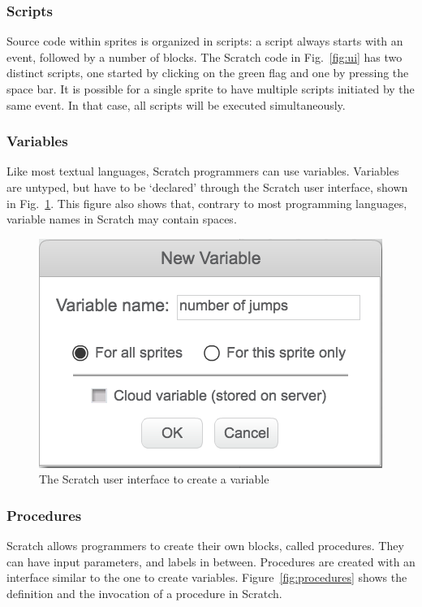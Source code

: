 \documentclass[conference]{IEEEtran}
\begin{document}
\subsubsection{Scripts}
Source code within sprites is organized in scripts: a script always starts with an event, followed by a number of blocks. The Scratch code in Fig.~\ref{fig:ui} has two distinct scripts, one started by clicking on the green flag and one by pressing the space bar. It is possible for a single sprite to have multiple scripts initiated by the same event. In that case, all scripts will be executed simultaneously. 



\subsubsection{Variables}
Like most textual languages, Scratch programmers can use variables. Variables are untyped, but have to be `declared' through the Scratch user interface, shown in Fig.~\ref{fig:ui-vars}. This figure also shows that, contrary to most programming languages, variable names in Scratch may contain spaces.

\begin{figure}[tb]
  \begin{center}
  \includegraphics[scale=0.45]{fig/ui-vars.png}
  \caption{The Scratch user interface to create a variable}
  \label{fig:ui-vars}
  \end{center}
\end{figure} 

\subsubsection{Procedures} \label {sec:Scratch_func}
Scratch allows programmers to create their own blocks, called procedures. They can have input parameters, and labels in between. Procedures are created with an interface similar to the one to create variables. Figure~\ref{fig:procedures} shows the definition and the invocation of a procedure in Scratch.
\end{document}
